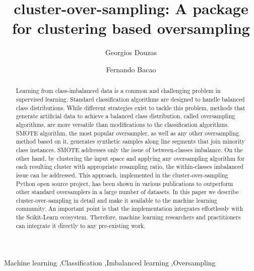 \documentclass[preprint,12pt, a4paper]{elsarticle}
\begin{document}
\begin{frontmatter}

\title{cluster-over-sampling: A package for clustering based oversampling}

\author{Georgios Douzas}

\author{Fernando Bacao}

\address{NOVA Information Management School, Universidade Nova de Lisboa}


\begin{abstract}
	Learning from class-imbalanced data is a common and challenging problem in supervised learning. Standard classification algorithms are designed to handle balanced class distributions. While different strategies exist to tackle this problem, methods that generate artificial data to achieve a balanced class distribution, called oversampling algorithms, are more versatile than modifications to the classification algorithms. SMOTE algorithm, the most popular oversampler, as well as any other oversampling method based on it, generates synthetic samples along line segments that join minority class instances. SMOTE addresses only the issue of between-classes imbalance. On the other hand, by clustering the input space and applying any oversampling algorithm for each resulting cluster with appropriate resampling ratio, the within-classes imbalanced issue can be addressed. This approach, implemented in the cluster-over-sampling Python open source project, has been shown in various publications to outperform other standard oversamplers in a large number of datasets. In this paper we describe cluster-over-sampling in detail and make it available to the machine learning community. An important point is that the implementation integrates effortlessly with the Scikit-Learn ecosystem. Therefore, machine learning researchers and practitioners can integrate it directly to any pre-existing work.
\end{abstract}

\begin{keyword}
Machine learning \sep Classification \sep Imbalanced learning \sep Oversampling
\end{keyword}

\end{frontmatter}
\end{document}
